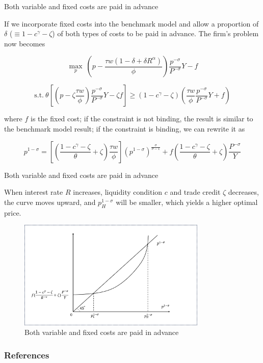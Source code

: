 \documentclass[10pt]{beamer}
\begin{document}
\begin{frame}{Both variable and fixed costs are paid in advance}

If we incorporate fixed costs into the benchmark model and allow a proportion of $\delta$ ($\equiv 1-c^{\gamma}-\zeta$) of both types of costs to be paid in advance. The firm's problem now becomes

$$
\max_{p} \ (p- \frac{\tau w(1-\delta+\delta R^\alpha)}{\phi}) \frac{p^{-\sigma}}{P^{-\sigma}} Y-f
$$

$$
\text{s.t.} \ \theta [(p -\zeta \frac{\tau w}{\phi}) \frac{p^{-\sigma}}{P^{-\sigma}} Y -\zeta f ]\geq(1-c^\gamma-\zeta) (\frac{\tau w}{\phi} \frac{p^{-\sigma}}{P^{-\sigma}} Y+f)
$$

where $f$ is the fixed cost; if the constraint is not binding, the result is similar to the benchmark model result; if the constraint is binding, we can rewrite it as 

\begin{equation}\label{eq:constraint_fixedcost}
p^{1-\sigma}=[(\frac{1-c^{\gamma}-\zeta}{\theta}+\zeta)\frac{\tau w}{\phi}] (p^{1-\sigma})^{\frac{\sigma}{\sigma-1}}+f(\frac{1-c^{\gamma}-\zeta}{\theta}+\zeta)\frac{P^{-\sigma}}{Y}
\end{equation}

\end{frame}


\begin{frame}{Both variable and fixed costs are paid in advance}

When interest rate $R$ increases, liquidity condition $c$ and trade credit $\zeta$ decreases, the curve moves upward, and $p_H^{1-\sigma}$ will be smaller, which yields a higher optimal price.

\begin{figure}[H]
     \centering
         \includegraphics[width=0.8\textwidth]{latex/drafts/pic/fixed_cost.png}
         \caption{\small Both variable and fixed costs are paid in advance}
         \label{fig: fixed_cost}
\end{figure}

\end{frame}







\begin{frame}[allowframebreaks]
\frametitle{References}
    \footnotesize
    
\end{frame}
\end{document}
